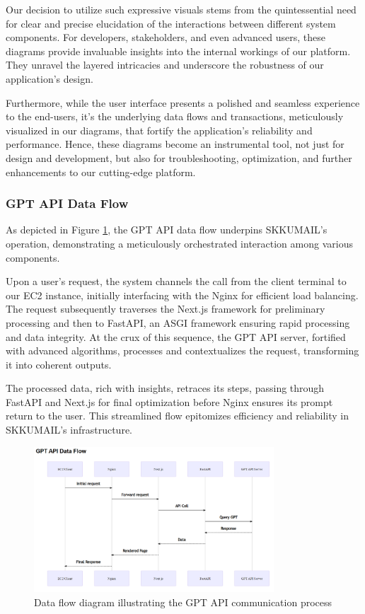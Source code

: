 \documentclass[12pt]{article}
\begin{document}
Our decision to utilize such expressive visuals stems from the quintessential need for clear and precise elucidation of the interactions between different system components. For developers, stakeholders, and even advanced users, these diagrams provide invaluable insights into the internal workings of our platform. They unravel the layered intricacies and underscore the robustness of our application’s design.

Furthermore, while the user interface presents a polished and seamless experience to the end-users, it's the underlying data flows and transactions, meticulously visualized in our diagrams, that fortify the application's reliability and performance. Hence, these diagrams become an instrumental tool, not just for design and development, but also for troubleshooting, optimization, and further enhancements to our cutting-edge platform.


\subsubsection{GPT API Data Flow}

As depicted in Figure \ref{fig:gpt_api_flow}, the GPT API data flow underpins SKKUMAIL's operation, demonstrating a meticulously orchestrated interaction among various components.

Upon a user's request, the system channels the call from the client terminal to our EC2 instance, initially interfacing with the Nginx for efficient load balancing. The request subsequently traverses the Next.js framework for preliminary processing and then to FastAPI, an ASGI framework ensuring rapid processing and data integrity. At the crux of this sequence, the GPT API server, fortified with advanced algorithms, processes and contextualizes the request, transforming it into coherent outputs.

The processed data, rich with insights, retraces its steps, passing through FastAPI and Next.js for final optimization before Nginx ensures its prompt return to the user. This streamlined flow epitomizes efficiency and reliability in SKKUMAIL's infrastructure.


\begin{figure}[ht]
	\centering
	\includegraphics[width=0.8\textwidth]{gpt_api_flow.png}
	\caption{Data flow diagram illustrating the GPT API communication process}
	\label{fig:gpt_api_flow}
\end{figure}
\end{document}
